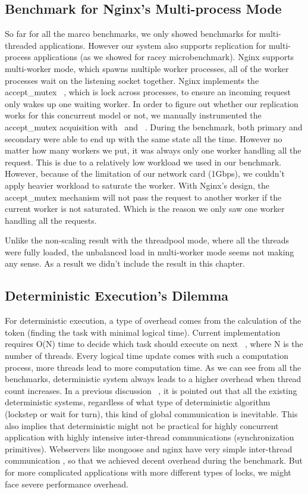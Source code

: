 \subsection{Benchmark for Nginx's Multi-process Mode}
So far for all the marco benchmarks, we only showed benchmarks for multi-threaded applications. However our system also supports replication for multi-process applications (as we showed for racey microbenchmark). Nginx supports multi-worker mode, which spawns multiple worker processes, all of the worker processes wait on the listening socket together. Nginx implements the accept\_mutex ~\cite{nginxscalability}, which is lock across processes, to ensure an incoming request only wakes up one waiting worker. In order to figure out whether our replication works for this concurrent model or not, we manually instrumented the accept\_mutex acquisition with \detstart\ and \detend\ . During the benchmark, both primary and secondary were able to end up with the same state all the time. However no matter how many workers we put, it was always only one worker handling all the request. This is due to a relatively low workload we used in our benchmark. However, because of the limitation of our network card (1Gbps), we couldn't apply heavier workload to saturate the worker. With Nginx's design, the accept\_mutex mechanism will not pass the request to another worker if the current worker is not saturated. Which is the reason we only saw one worker handling all the requests.

Unlike the non-scaling result with the threadpool mode, where all the threads were fully loaded, the unbalanced load in multi-worker mode seems not making any sense. As a result we didn't include the result in this chapter.

\subsection{Deterministic Execution's Dilemma}
For deterministic execution, a type of overhead comes from the calculation of the token (finding the task with minimal logical time). Current implementation requires O(N) time to decide which task should execute on next \detstart\ , where N is the number of threads. Every logical time update comes with such a computation process, more threads lead to more computation time.  As we can see from all the benchmarks, deterministic system always leads to a higher overhead when thread count increases. In a previous discussion ~\cite{bergan2011deterministic}, it is pointed out that all the existing deterministic systems, regardless of what type of deterministic algorithm (lockstep or wait for turn), this kind of global communication is inevitable. This also implies that deterministic might not be practical for highly concurrent application with highly intensive inter-thread communications (synchronization primitives). Webservers like mongoose and nginx have very simple inter-thread communication , so that we achieved decent overhead during the benchmark. But for more complicated applications with more different types of locks, we might face severe performance overhead.

